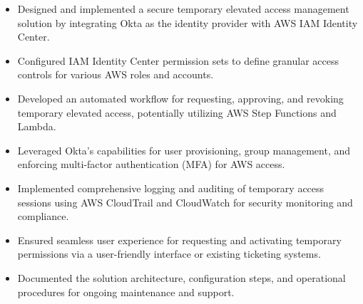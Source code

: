 \documentclass[10pt,a4paper,ragged2e,withhyper]{altacv}
\begin{document}
\begin{itemize}
    \item Designed and implemented a secure temporary elevated access management solution by integrating Okta as the identity provider with AWS IAM Identity Center.
    \item Configured IAM Identity Center permission sets to define granular access controls for various AWS roles and accounts.
    \item Developed an automated workflow for requesting, approving, and revoking temporary elevated access, potentially utilizing AWS Step Functions and Lambda.
    \item Leveraged Okta's capabilities for user provisioning, group management, and enforcing multi-factor authentication (MFA) for AWS access.
    \item Implemented comprehensive logging and auditing of temporary access sessions using AWS CloudTrail and CloudWatch for security monitoring and compliance.
    \item Ensured seamless user experience for requesting and activating temporary permissions via a user-friendly interface or existing ticketing systems.
    \item Documented the solution architecture, configuration steps, and operational procedures for ongoing maintenance and support.
\end{itemize}


\pagebreak



\divider

\divider



\medskip

\end{document}
